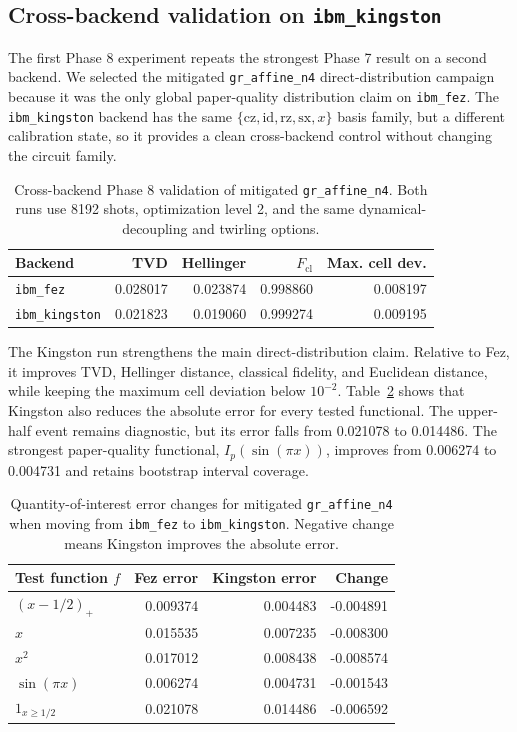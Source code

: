 \subsection{Cross-backend validation on \texttt{ibm\_kingston}}

The first Phase 8 experiment repeats the strongest Phase 7 result on a second
backend. We selected the mitigated \texttt{gr\_affine\_n4} direct-distribution
campaign because it was the only global paper-quality distribution claim on
\texttt{ibm\_fez}. The \texttt{ibm\_kingston} backend has the same
\(\{\mathrm{cz},\mathrm{id},\mathrm{rz},\mathrm{sx},x\}\) basis family, but a
different calibration state, so it provides a clean cross-backend control
without changing the circuit family.

\begin{table}[h]
\centering
\begin{tabular}{lrrrr}
\toprule
Backend & TVD & Hellinger & \(F_{\mathrm{cl}}\) & Max. cell dev. \\
\midrule
\texttt{ibm\_fez} & 0.028017 & 0.023874 & 0.998860 & 0.008197 \\
\texttt{ibm\_kingston} & 0.021823 & 0.019060 & 0.999274 & 0.009195 \\
\bottomrule
\end{tabular}
\caption{Cross-backend Phase 8 validation of mitigated
\texttt{gr\_affine\_n4}. Both runs use 8192 shots, optimization level 2, and
the same dynamical-decoupling and twirling options.}
\label{tab:phase8-affine-cross-backend}
\end{table}

The Kingston run strengthens the main direct-distribution claim. Relative to
Fez, it improves TVD, Hellinger distance, classical fidelity, and Euclidean
distance, while keeping the maximum cell deviation below \(10^{-2}\).
Table~\ref{tab:phase8-affine-qoi-delta} shows that Kingston also reduces the
absolute error for every tested functional. The upper-half event remains
diagnostic, but its error falls from 0.021078 to 0.014486. The strongest
paper-quality functional, \(I_p(\sin(\pi x))\), improves from 0.006274 to
0.004731 and retains bootstrap interval coverage.

\begin{table}[h]
\centering
\begin{tabular}{lrrr}
\toprule
Test function \(f\) & Fez error & Kingston error & Change \\
\midrule
\((x-1/2)_+\) & 0.009374 & 0.004483 & -0.004891 \\
\(x\) & 0.015535 & 0.007235 & -0.008300 \\
\(x^2\) & 0.017012 & 0.008438 & -0.008574 \\
\(\sin(\pi x)\) & 0.006274 & 0.004731 & -0.001543 \\
\(1_{x\ge1/2}\) & 0.021078 & 0.014486 & -0.006592 \\
\bottomrule
\end{tabular}
\caption{Quantity-of-interest error changes for mitigated
\texttt{gr\_affine\_n4} when moving from \texttt{ibm\_fez} to
\texttt{ibm\_kingston}. Negative change means Kingston improves the absolute
error.}
\label{tab:phase8-affine-qoi-delta}
\end{table}

